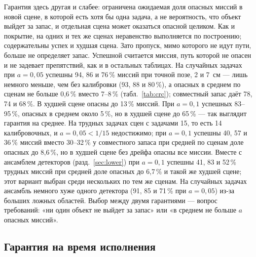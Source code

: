Гарантия здесь другая и слабее: ограничена ожидаемая доля опасных миссий в новой сцене, в которой есть хотя бы одна задача, а не вероятность, что объект выйдет за запас, и отдельная сцена может оказаться опасной целиком. Как и покрытие, на одних и тех же сценах неравенство выполняется по построению; содержательны успех и худшая сцена. Зато пропуск, мимо которого не идут пути, больше не определяет запас. Успешной считается миссия, путь которой не опасен и не задевает препятствий, как и в остальных таблицах. На случайных задачах при $a = 0{,}05$ успешны 94, 86 и 76\,\% миссий при точной позе, 2 и 7~см --- лишь немного меньше, чем без калибровки (93, 88 и 80\,\%), а опасных в среднем по сценам не больше 0,6\,\% вместо 7--8\,\% (табл.~\ref{tab:crc}); совместный запас даёт 78, 74 и 68\,\%. В худшей сцене опасны до 13\,\% миссий. При $a = 0{,}1$ успешных 83--95\,\%, опасных в среднем около 5\,\%, но в худшей сцене до 65\,\% --- так выглядит гарантия на среднее. На трудных задачах сцен с задачами 15, то есть 14 калибровочных, и $a = 0{,}05 < 1/15$ недостижимо; при $a = 0{,}1$ успешны 40, 57 и 36\,\% миссий вместо 30--32\,\% у совместного запаса при средней по сценам доле опасных до 8,6\,\%, но в худшей сцене без дрейфа опасны все миссии. Вместе с ансамблем детекторов (разд.~\ref{sec:lower}) при $a = 0{,}1$ успешны 41, 83 и 52\,\% трудных миссий при средней доле опасных до 6,7\,\% и такой же худшей сцене; этот вариант выбран среди нескольких по тем же сценам. На случайных задачах ансамбль немного хуже одного детектора (91, 85 и 71\,\% при $a = 0{,}05$) из-за больших ложных областей. Выбор между двумя гарантиями --- вопрос требований: «ни один объект не выйдет за запас» или «в среднем не больше $a$ опасных миссий».

\subsection{Гарантия на время исполнения}\label{sec:execution}

\begin{table}[htbp]
\centering\scriptsize\setlength{\tabcolsep}{3.2pt}
\caption{Пути с гарантией по плану ($a = 0{,}2$) при исполнении с продолжающимся дрейфом (20 исполнений на путь): отклонение от заданной траектории в процентах пройденного пути, доля задач с гарантированным путём (от всех задач), доля опасных и задевших препятствие исполнений среди гарантированных; справа --- правило с запасом на исполнение}
\label{tab:execution}

\end{table}

